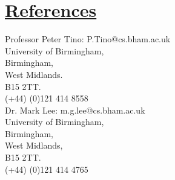 \documentclass[11pt]{article}
\begin{document}
				
	\vspace{-20pt}
	\hspace{-100pt}\section*{\underline{References}}	
				\begin{multicols}{2}
					\noindent
					Professor Peter Tino:  P.Tino@cs.bham.ac.uk  \\
					University of Birmingham,\\
					Birmingham, \\
					West Midlands.\\
					B15 2TT.\\
					(+44) (0)121 414 8558\\
	
					\noindent
					Dr. Mark Lee: m.g.lee@cs.bham.ac.uk\\
					University of Birmingham,\\
					Birmingham,\\
					West Midlands,\\
					B15 2TT.\\
					(+44) (0)121 414 4765\\
				\end{multicols}
\end{document}
